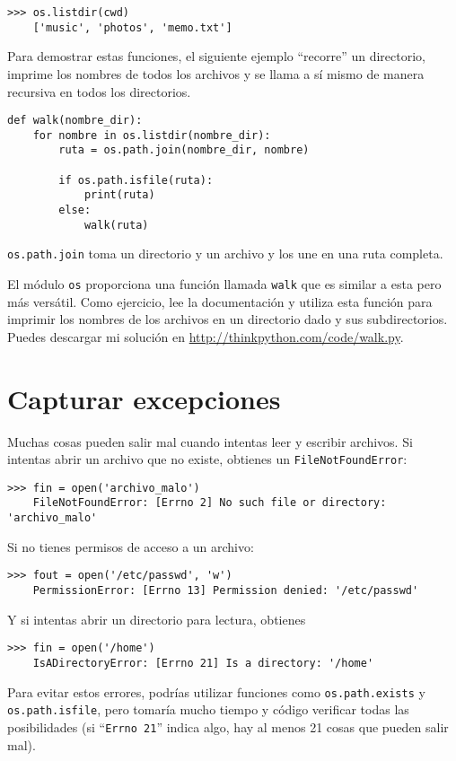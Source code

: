 \documentclass[10pt]{book}
\begin{document}
\begin{verbatim}
>>> os.listdir(cwd)
    ['music', 'photos', 'memo.txt']
\end{verbatim}
%
Para demostrar estas funciones, el siguiente ejemplo
``recorre'' un directorio, imprime
los nombres de todos los archivos y se llama a sí mismo de manera recursiva en
todos los directorios.

\begin{verbatim}
def walk(nombre_dir):
    for nombre in os.listdir(nombre_dir):
        ruta = os.path.join(nombre_dir, nombre)

        if os.path.isfile(ruta):
            print(ruta)
        else:
            walk(ruta)
\end{verbatim}
%
{\tt os.path.join} toma un directorio y un archivo y los une
en una ruta completa.

El módulo {\tt os} proporciona una función llamada {\tt walk} que es
similar a esta pero más versátil.  Como ejercicio, lee la
documentación y utiliza esta función para imprimir los nombres de los archivos
en un directorio dado y sus subdirectorios.  Puedes descargar mi solución en
\url{http://thinkpython.com/code/walk.py}.


\section{Capturar excepciones}
\label{catch}

Muchas cosas pueden salir mal cuando intentas leer y escribir
archivos.  Si intentas abrir un archivo que no existe, obtienes un
{\tt FileNotFoundError}:

\begin{verbatim}
>>> fin = open('archivo_malo')
    FileNotFoundError: [Errno 2] No such file or directory: 'archivo_malo'
\end{verbatim}
%
Si no tienes permisos de acceso a un archivo:

\begin{verbatim}
>>> fout = open('/etc/passwd', 'w')
    PermissionError: [Errno 13] Permission denied: '/etc/passwd'
\end{verbatim}
%
Y si intentas abrir un directorio para lectura, obtienes

\begin{verbatim}
>>> fin = open('/home')
    IsADirectoryError: [Errno 21] Is a directory: '/home'
\end{verbatim}
%
Para evitar estos errores, podrías utilizar funciones como {\tt os.path.exists}
y {\tt os.path.isfile}, pero tomaría mucho tiempo y código
verificar todas las posibilidades (si ``{\tt Errno 21}'' indica
algo, hay al menos 21 cosas que pueden salir mal).
\end{document}

